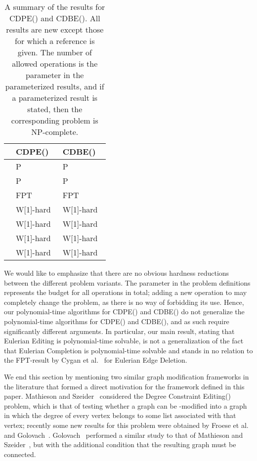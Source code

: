 \documentclass[11pt]{llncs}
\newcommand{\cdpe}{{\sc CDPE}}
\newcommand{\cdbe}{{\sc CDBE}}
\renewcommand{\P}{{\sf P}}
\newcommand{\NP}{{\sf NP}}
\newcommand{\FPT}{{\sf FPT}}
\newcommand{\W}{{\sf W[1]}}
\begin{document}
\begin{table}[htb]
\begin{center}
\begin{tabular}{l|l|l}
                    &  \cdpe()                             &  \cdbe()                           \\ \hline
           &  \P                                             &  \P                                            \\
                  &  \P                                             &   \P                                             \\
                  &  \FPT~\cite{CyganMPPS14} &  \FPT~\cite{CyganMPPS14} \\
                   &  \W-hard~\cite{CaiY11}               &  \W-hard~\cite{CyganMPPS14}\\
            &  \W-hard                               &  \W-hard\\
            &   \W-hard                              &  \W-hard \\
     &  \W-hard                             &  \W-hard \\
\end{tabular}
\end{center}
\caption{A summary of the results for \cdpe() and \cdbe(). All results are new except those for which a reference is given.
The number of allowed operations  is the parameter in the parameterized results, and if a parameterized result is stated, then the corresponding problem is
\NP-complete.} 
\label{t-thetable}
\end{table}

We would like to emphasize that there are no obvious hardness reductions between the different problem variants. The parameter  in the problem definitions represents the budget for all operations in total; adding a new operation to  may completely change the problem, as there is no way of forbidding its use. Hence, our polynomial-time algorithms for \cdpe() and \cdbe() do not generalize the polynomial-time algorithms for \cdpe() and \cdbe(), and as such require significantly different arguments. In particular, our main result, stating that {\sc Eulerian Editing} is polynomial-time solvable, is not a generalization of the fact that {\sc Eulerian Completion} is polynomial-time solvable and stands in no relation to the \FPT-result by Cygan et al.~\cite{CyganMPPS14} for {\sc Eulerian Edge Deletion}.

\medskip
\noindent
We end this section by mentioning two similar graph modification frameworks in the literature that formed a direct motivation for the framework defined in this paper.
Mathieson and Szeider~\cite{MathiesonS12} considered the {\sc Degree Constraint Editing()} problem, which is that of testing whether a graph  can be -modified into a graph  in which the degree of every vertex belongs to some list associated with that vertex;
recently some new results for this problem were obtained by Froese et al.~\cite{FroeseNN14} and Golovach~\cite{Golovach13a}.
Golovach~\cite{Golovach13} performed a similar study to that of Mathieson and Szeider~\cite{MathiesonS12}, but with the additional condition that the resulting graph must be connected.
\end{document}
